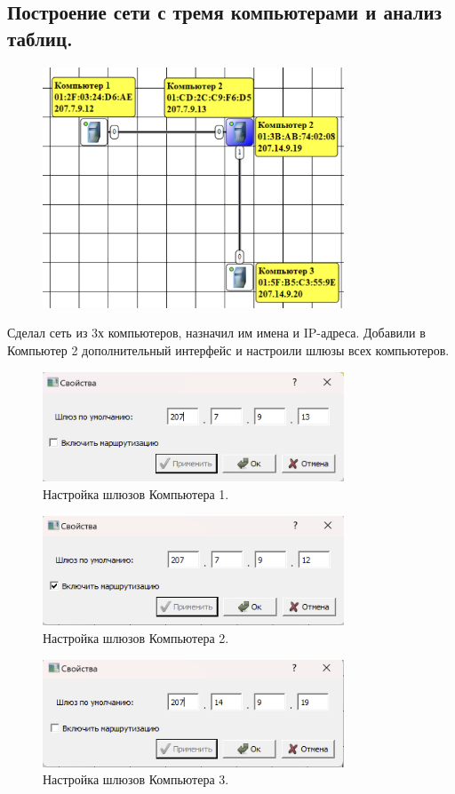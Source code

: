 \documentclass[12pt,onecolumn]{article}
\begin{document}
\begin{itemize}
\subsection{Построение сети с тремя компьютерами и анализ таблиц.}
\begin{figure}[H]
  \centering
  \includegraphics[width=0.8\textwidth]{image/3-computers.png}
\end{figure}
Сделал сеть из 3х компьютеров, назначил им имена и IP-адреса.
Добавили в Компьютер 2 дополнительный интерфейс и настроили шлюзы всех компьютеров.
\begin{figure}[H]
  \centering
  \includegraphics[width=0.8\textwidth]{image/gate-1.png}
  \caption{Настройка шлюзов Компьютера 1.}
\end{figure}
\begin{figure}[H]
  \centering
  \includegraphics[width=0.8\textwidth]{image/gate-2.png}
  \caption{Настройка шлюзов Компьютера 2.}
\end{figure}
\begin{figure}[H]
  \centering
  \includegraphics[width=0.8\textwidth]{image/gate-3.png}
  \caption{Настройка шлюзов Компьютера 3.}
\end{figure}

\end{itemize}
\end{document}
